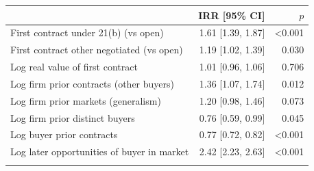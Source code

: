 \begin{tabular}{@{}lrr@{}}
\toprule
 & IRR [95\% CI] & $p$\\
\midrule
First contract under 21(b) (vs open) & 1.61 [1.39, 1.87] & <0.001\\
First contract other negotiated (vs open) & 1.19 [1.02, 1.39] & 0.030\\
Log real value of first contract & 1.01 [0.96, 1.06] & 0.706\\
Log firm prior contracts (other buyers) & 1.36 [1.07, 1.74] & 0.012\\
Log firm prior markets (generalism) & 1.20 [0.98, 1.46] & 0.073\\
Log firm prior distinct buyers & 0.76 [0.59, 0.99] & 0.045\\
Log buyer prior contracts & 0.77 [0.72, 0.82] & <0.001\\
Log later opportunities of buyer in market & 2.42 [2.23, 2.63] & <0.001\\
\botrule
\end{tabular}